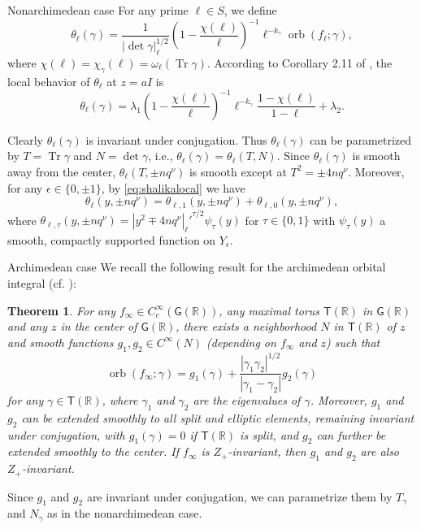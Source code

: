 \documentclass[10pt,oneside,reqno]{amsart}
\makeatletter
\newcommand\RR{\mathbb{R}}
\newcommand\G{\mathsf{G}}
\newcommand\T{\mathsf{T}}
\DeclareMathOperator\Tr{Tr}
\DeclareMathOperator\orb{orb}
\def\subsubsection{\@startsection{subsubsection}{2}
  \z@{1pt\@plus0pt}{-.5em}
  {\normalfont\itshape}}
\theoremstyle{THEOREM}
\newtheorem{theorem}{Theorem}[section]
\theoremstyle{DEFINITION}
\theoremstyle{EXERCISE}
\numberwithin{equation}{section}
\makeatother
\begin{document}
\subsubsection{Nonarchimedean case}
For any prime $\ell\in S$, we define
\[
\theta_{\ell}(\gamma)=\frac{1}{\mathopen{|}\det\gamma\mathclose{|}_\ell^{1/2}}\left(1-\frac{\chi(\ell)}{\ell}\right)^{-1}\ell^{-{k_\gamma}}\orb(f_{\ell};\gamma),
\]
where $\chi(\ell)=\chi_\gamma(\ell)=\omega_\ell(\Tr\gamma)$. According to Corollary 2.11 of \cite{cheng2025}, the local behavior of $\theta_{\ell}$ at $z=aI$ is
\begin{equation}\label{eq:shalikalocal}
\theta_{\ell}(\gamma)=\lambda_1\left(1-\frac{\chi(\ell)}{\ell}\right)^{-1}\ell^{-{k_\gamma}} \frac{1-\chi(\ell)}{1-\ell}+\lambda_2.
\end{equation}

Clearly $\theta_{\ell}(\gamma)$ is invariant under conjugation. Thus $\theta_{\ell}(\gamma)$ can be parametrized by $T=\Tr\gamma$ and $N=\det\gamma$, i.e., $\theta_{\ell}(\gamma)=\theta_\ell(T,N)$. 
Since $\theta_\ell(\gamma)$ is smooth away from the center, $\theta_\ell(T,\pm nq^\nu)$ is smooth except at $T^2=\pm 4nq^\nu$. Moreover, for any $\epsilon\in \{0,\pm 1\}$, by \eqref{eq:shalikalocal} we have
\[
\theta_\ell(y,\pm nq^\nu)=\theta_{\ell,1}(y,\pm nq^\nu)+\theta_{\ell,0}(y,\pm nq^\nu),
\]
where $\theta_{\ell,\tau}(y,\pm nq^\nu)={|y^2\mp 4nq^\nu|_\ell'}^{\tau/2}\psi_\tau(y)$ for $\tau\in \{0,1\}$ with $\psi_\tau(y)$ a smooth, compactly supported function on $Y_\epsilon$.

\subsubsection{Archimedean case}
We recall the following result for the archimedean orbital integral (cf. \cite[Theorem 2.12]{cheng2025}):

\begin{theorem}\label{thm:archimedeanintegral}
For any $f_\infty\in C_c^\infty(\G(\RR))$, any maximal torus $\T(\RR)$ in $\G(\RR)$ and any $z$ in the center of $\G(\RR)$, there exists a neighborhood $N$ in $\T(\RR)$ of $z$ and smooth functions $g_1,g_2\in C^\infty(N)$ (depending on $f_\infty$ and $z$) such that
\begin{equation}\label{eq:archimedeanintegral}
\orb(f_\infty;\gamma)=g_1(\gamma)+\frac{|\gamma_1\gamma_2|^{1/2}}{|\gamma_1-\gamma_2|}g_2(\gamma)
\end{equation}
for any $\gamma\in \T(\RR)$, where $\gamma_1$ and $\gamma_2$ are the eigenvalues of $\gamma$.  Moreover, $g_1$ and $g_2$ can be extended smoothly to all split and elliptic elements, remaining invariant under conjugation, with $g_1(\gamma)=0$ if $\T(\RR)$ is split, and $g_2$ can further be extended smoothly to the center. If $f_\infty$ is $Z_+$-invariant, then $g_1$ and $g_2$ are also $Z_+$-invariant.
\end{theorem}
Since $g_1$ and $g_2$ are invariant under conjugation, we can parametrize them by $T_\gamma$ and $N_\gamma$ as in the nonarchimedean case.
\end{document}
